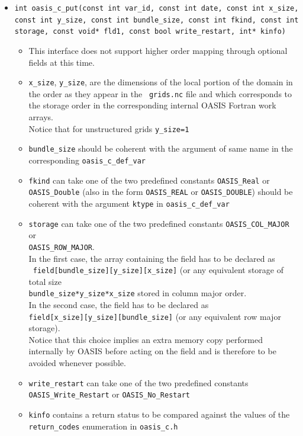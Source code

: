 \begin{itemize}
\vspace{0.2cm}
\item {\tt int oasis\_c\_put(const int var\_id, const int date, const
  int x\_size, const int y\_size, const int bundle\_size, const int
  fkind, const int storage, const void* fld1, const bool
  write\_restart, int* kinfo)}
  \begin{itemize}
  \item This interface does not support higher order mapping through optional fields at this time.
  \item {\tt x\_size}, {\tt y\_size}, are the dimensions of the local
    portion of the domain in the order as they appear in the {\tt
      grids.nc} file and which corresponds to the storage order in the
    corresponding internal OASIS Fortran work arrays. \\
    Notice that for
    unstructured grids {\tt y\_size=1}
  \item {\tt bundle\_size} should be coherent with the argument of
    same name in the corresponding {\tt oasis\_c\_def\_var}
  \item {\tt fkind} can take one of the two predefined constants
    {\tt OASIS\_Real} or {\tt OASIS\_Double} (also in the form
    {\tt OASIS\_REAL} or {\tt OASIS\_DOUBLE}) should be coherent with
    the argument {\tt ktype} in {\tt oasis\_c\_def\_var}
  \item {\tt storage} can take one of the two predefined constants
    {\tt OASIS\_COL\_MAJOR} or \\
    {\tt OASIS\_ROW\_MAJOR}. \\
    In the first
    case, the array containing the field has to be declared as \\ {\tt
      field[bundle\_size][y\_size][x\_size]} (or any equivalent
    storage of total size \\
    {\tt bundle\_size*y\_size*x\_size} stored in
    column major order. \\
    In the second case, the field has to be
    declared as \\
    {\tt field[x\_size][y\_size][bundle\_size]} (or any
    equivalent row major storage). \\
    Notice that this choice implies an
    extra memory copy performed internally by OASIS before acting on
    the field and is therefore to be avoided whenever possible.
  \item {\tt write\_restart} can take one of the two predefined constants
    {\tt OASIS\_Write\_Restart} or {\tt OASIS\_No\_Restart}
  \item {\tt kinfo} contains a return status to be compared against
    the values of the {\tt return\_codes} enumeration in {\tt oasis\_c.h}
  \end{itemize}


\end{itemize}
